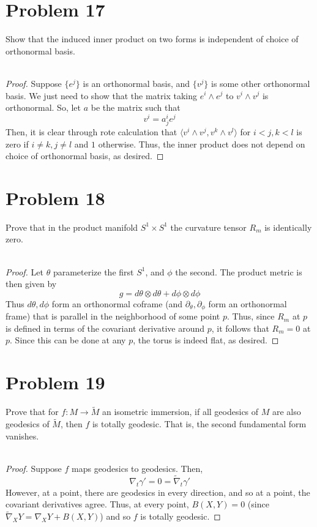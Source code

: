 \documentclass[fontsize=11pt]{scrartcl} %
\numberwithin{equation}{section} %
\numberwithin{figure}{section} %
\numberwithin{table}{section} %
\begin{document}
\section*{Problem 17}
Show that the induced inner product on two forms is independent of choice of
orthonormal basis.
\\
\\
\begin{proof}
    Suppose $\{e^j\}$ is an orthonormal basis, and $\{v^j\}$ is some other
    orthonormal basis. We just need to show that the matrix taking $e^i\wedge
    e^j$ to $v^i\wedge v^j$ is orthonormal. So, let $a$ be the matrix such that
    \[
        v^i = a^i_je^j
    \]
    Then, it is clear through rote calculation that $\langle v^i\wedge
    v^j, v^k\wedge v^l\rangle$ for $i<j,k<l$ is zero if $i\neq k,j\neq l$ and
    $1$ otherwise. Thus, the inner product does not depend on choice of
    orthonormal basis, as desired.

\end{proof}

\section*{Problem 18}
Prove that in the product manifold $S^1\times S^1$ the curvature tensor $R_m$ is
identically zero.
\\
\\
\begin{proof}
    Let $\theta$ parameterize the first $S^1$, and $\phi$ the second. The
    product metric is then given by
    \[
        g = d\theta\otimes d\theta + d\phi\otimes d\phi
    \]
    Thus $d\theta,d\phi$ form an orthonormal coframe (and
    $\partial_{\theta},\partial_{\phi}$ form an orthonormal frame) that is
    parallel in the neighborhood of some point $p$. Thus, since $R_m$ at $p$ is
    defined in terms of the covariant derivative around $p$, it follows that
    $R_m=0$ at $p$. Since this can be done at any $p$, the torus is indeed flat,
    as desired.
\end{proof}

\section*{Problem 19}
Prove that for $f:M\to \tilde{M}$ an isometric immersion, if all geodesics of
$M$ are also geodesics of $\tilde{M}$, then $f$ is totally geodesic. That is,
the second fundamental form vanishes.
\\
\\
\begin{proof}
    Suppose $f$ maps geodesics to geodesics. Then,
    \[
        \nabla_t\gamma' = 0 = \tilde{\nabla}_t\gamma'
    \]
    However, at a point, there are geodesics
    in every direction, and so at a point, the covariant derivatives agree.
    Thus, at every point, $B(X,Y)=0$ (since $\tilde{\nabla}_XY = \nabla_XY
    +B(X,Y)$) and so $f$ is totally geodesic.
\end{proof}
\end{document}

